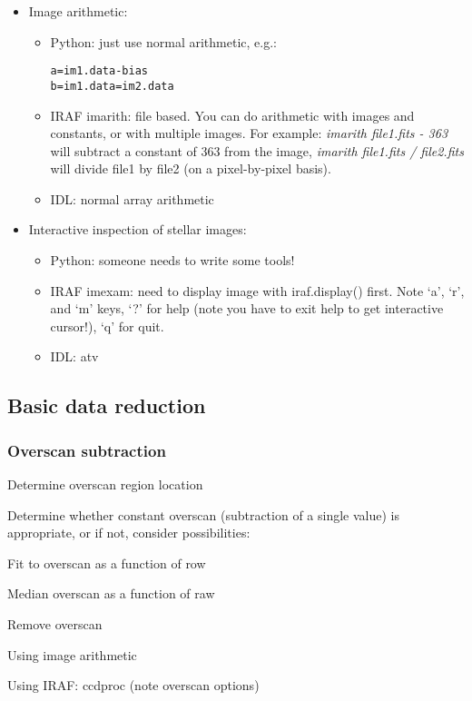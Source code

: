 \documentclass{article}
\begin{document}
\begin{itemize}
\item Image arithmetic:
    \begin{itemize}
        \item Python: just use normal arithmetic, e.g.:
            \begin{verbatim}
a=im1.data-bias
b=im1.data=im2.data
            \end{verbatim}
        \item IRAF imarith: file based. You can do arithmetic with images and
            constants, or with multiple images. For example:
            \emph{imarith file1.fits - 363}
            will subtract a constant of 363 from the image,
            \emph{imarith file1.fits / file2.fits}
            will divide file1 by file2 (on a pixel-by-pixel basis).
        \item IDL: normal array arithmetic
    \end{itemize}

\item Interactive inspection of stellar images:
    \begin{itemize}
        \item Python: someone needs to write some tools!
        \item IRAF imexam: need to display image with iraf.display() first. Note
            `a', `r', and `m' keys, `?' for help (note you have to exit help
            to get interactive cursor!), `q' for quit.
        \item IDL: atv
    \end{itemize}
\end{itemize}

\subsection*{Basic data reduction}
\subsubsection*{Overscan subtraction}
\begin{itemize*}
    \item Determine overscan region location
    \item Determine whether constant overscan (subtraction of a single value) is
        appropriate, or if not, consider possibilities:
        \begin{itemize*}
            \item Fit to overscan as a function of row
            \item Median overscan as a function of raw
        \end{itemize*}
    \item Remove overscan
        \begin{itemize*}
            \item Using image arithmetic
            \item Using IRAF: ccdproc (note overscan options)
        \end{itemize*}
\end{itemize*}
\end{document}
